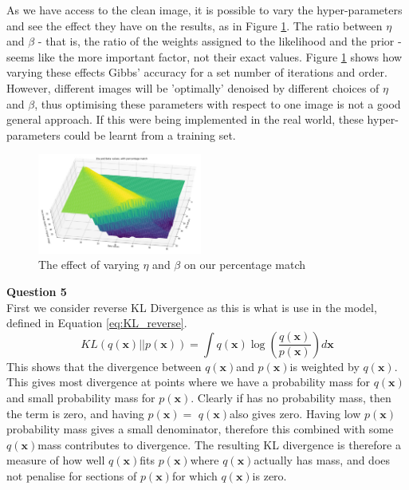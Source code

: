 \documentclass[10pt, a4paper, twocolumn]{article} %
\def \qx   {$q(\textbf{x})$}
\def \px   {$p(\textbf{x})$}
\begin{document}
As we have access to the clean image, it is possible to vary the hyper-parameters and see the effect they have on the results, as in Figure \ref{fig:EtaBetaVariation}. The ratio between $\eta$ and $\beta$ - that is, the ratio of the weights assigned to the likelihood and the prior - seems like the more important factor, not their exact values. Figure \ref{fig:EtaBetaVariation} shows how varying these effects Gibbs' accuracy for a set number of iterations and order. However, different images will be 'optimally' denoised by different choices of $\eta$ and $\beta$, thus optimising these parameters with respect to one image is not a good general approach. If this were being implemented in the real world, these hyper-parameters could be learnt from a training set.
\begin{figure}
    \centering
    \includegraphics[width=0.48\textwidth]{images/etaBetaResize.png}
    \caption{The effect of varying $\eta$ and $\beta$ on our percentage match}
    \label{fig:EtaBetaVariation}
\end{figure}

\textbf{Question 5}\\
First we consider reverse KL Divergence as this is what is use in the model, defined in Equation \ref{eq:KL_reverse}.
\begin{equation}
     KL(q(\mathbf{x})||p(\mathbf{x})) =  \int q(\mathbf{x}) \log\left(\frac{q(\mathbf{x})}{p(\mathbf{x})}\right)d\textbf{x}
     \label{eq:KL_reverse}
\end{equation}
This shows that the divergence between \qx and \px is weighted by \qx. This gives most divergence at points where we have a probability mass for \qx and small probability mass for \px. Clearly if \q  has no probability mass, then the term is zero, and having \px $=$ \qx also gives zero. Having low \px probability mass gives a small denominator, therefore this combined with some \qx mass contributes to divergence. The resulting KL divergence is therefore a measure of how well \qx fits \px where \qx actually has mass, and does not penalise for sections of \px for which \qx is zero.  
\end{document}
